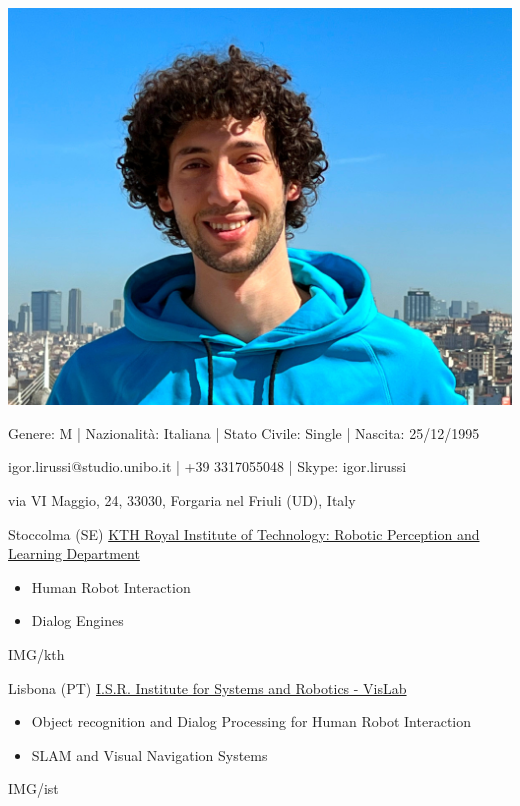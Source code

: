 \documentclass[paper=a4,fontsize=11pt]{temp} %
\begin{document}
\begin{minipage}{.2\linewidth}
   \includegraphics[width=1\textwidth]{photo}
\end{minipage}      
\begin{minipage}{0.7\linewidth}
   \sepspace
   \noindent
  \hfill Genere: M | Nazionalità: Italiana | Stato Civile: Single | Nascita: 25/12/1995
  
  \hfill igor.lirussi@studio.unibo.it | +39 3317055048 | Skype: igor.lirussi
   

   
   \hfill via VI Maggio, 24, 33030, Forgaria nel Friuli (UD), Italy
 
 
\end{minipage}


\noindent

{Stoccolma (SE) \href{https://www.kth.se/is/rpl}{KTH Royal Institute of Technology: Robotic Perception and Learning Department}}
{
 \begin{itemize}
    \item Human Robot Interaction
    \item Dialog Engines
 \end{itemize}
} {IMG/kth}

\sepspace

{Lisbona (PT) \href{https://welcome.isr.tecnico.ulisboa.pt/}{ I.S.R. Institute for Systems and Robotics - VisLab}}
{
 \begin{itemize}
    \item Object recognition and Dialog Processing for Human Robot Interaction
    \item SLAM and Visual Navigation Systems
 \end{itemize}
} {IMG/ist}
\end{document}
